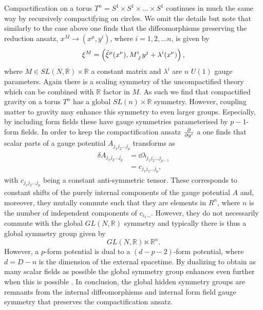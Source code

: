 Compactification on a torus $T^n=S^1\times S^1\times\ldots\times S^1$ continues in much the same way by recursively compactifying on circles. We omit the details but note that similarly to the case above one finds that the diffeomorphisms preserving the reduction ansatz, $x^M\to (x^\mu,y^i)$, where $i=1,2,\ldots n$, is given by 
\begin{equation}
    \xi^M = \left(\hat{\xi}^\mu(x^\nu),\tensor{M}{^i_j}y^j+\lambda^i(x^\nu)\right),
\end{equation}
where $M\in SL(N,\mathbb{R})\times \mathbb{R}$ a constant matrix and $\lambda^i$ are $n$ $U(1)$ gauge parameters. Again there is a scaling symmetry of the uncompactified theory which can be combined with $\mathbb{R}$ factor in $M$. As such we find that compactified gravity on a torus $T^n$ has a global $SL(n)\times\mathbb{R}$ symmetry. However, coupling matter to gravity may enhance this symmetry to even larger groups. Especially, by including form fields these have gauge symmetries parameterised by $p-1$-form fields. In order to keep the compactification ansatz $\frac{\partial}{\partial y^i}$ a one finds that scalar parts of a gauge potential $A_{j_1j_2\ldots j_p}$ transforms as 
\begin{equation}
    \begin{aligned}
    \delta A_{j_1j_2\ldots j_p} &= \dd \lambda_{j_1j_2\ldots j_{p-1}}\\
                                &= c_{j_1j_2\ldots j_p},
    \end{aligned}
\end{equation}
with $c_{j_1j_2\ldots j_p}$ being a constant anti-symmetric tensor. These corresponds to constant shifts of the purely internal components of the gauge potential $A$ and, moreover, they mutally commute such that they are elements in $R^n$, where $n$ is the number of independent components of $c_{i_1\ldots}$. However, they do not necessarily commute with the global $GL(N,\mathbb{R})$ symmetry and typically there is thus a global symmetry group given by 
\begin{equation}
    GL(N,\mathbb{R})\ltimes \mathbb{R}^n.
\end{equation}
However, a $p$-form potential is dual to a $(d-p-2)$-form potential, where $d=D-n$ is the dimension of the external spacetime. By dualizing to obtain as many scalar fields as possible the global symmetry group enhances even further when this is possible \cite{Cremmer:1997ct}. In conclusion, the global hidden symmetry groups are remnants from the internal diffeomorphisms and internal form field gauge symmetry that preserves the compactification ansatz. 

